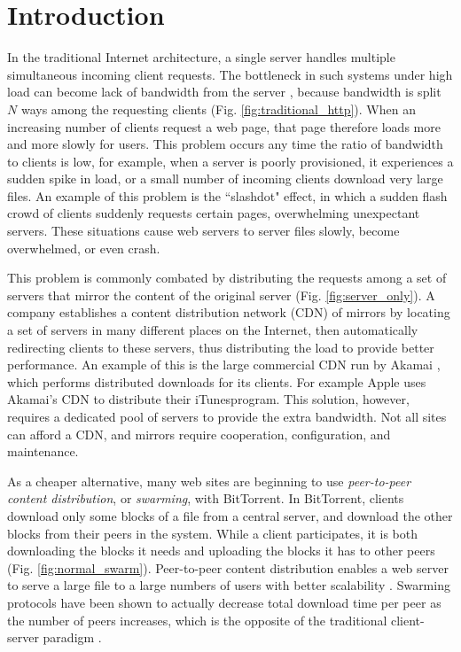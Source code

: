 \chapter {Introduction}

In the traditional Internet architecture, a single server handles multiple simultaneous incoming client requests.  
The bottleneck in such systems under high load can become lack of bandwidth from the server \cite{coopnet}, because bandwidth is split $N$ 
ways among the requesting clients (Fig. \ref{fig:traditional_http}).  When an increasing number of clients request a web page, that page 
therefore loads more and more slowly for users.  This problem occurs any time the ratio of bandwidth to clients is low, for example, when a server 
is poorly provisioned, it experiences a sudden spike in load, or a small number of incoming clients download very large files.  An example of this problem 
is the ``slashdot" effect, in which a sudden flash crowd of clients suddenly requests certain pages, overwhelming unexpectant servers.  
These situations cause web servers to server files slowly, become overwhelmed, or even crash.

This problem is commonly combated by distributing the requests among a set of servers that mirror the content of the original server (Fig. \ref{fig:server_only}).  
A company establishes a content distribution network (CDN) of mirrors by locating a set of servers in many different places on the Internet, then automatically redirecting clients to these servers, thus 
distributing the load to provide better performance.  An example of this is the large commercial CDN run by Akamai \cite{akamai}, which performs distributed
downloads for its clients.  For example Apple uses Akamai's CDN to distribute their iTunes\texttrademark   program.  This solution,  however, requires a dedicated pool of 
servers to provide the extra bandwidth.  Not all sites can afford a CDN, and  mirrors require cooperation, configuration, and maintenance.

As a cheaper alternative, many web sites are beginning to use \emph{peer-to-peer content distribution}, or \emph{swarming}, with BitTorrent.  In BitTorrent, clients 
download only some blocks of a file from a central server, and download the other blocks from their peers in the system.  While a client participates, it is both downloading 
the  blocks it needs and uploading the blocks it has to other peers (Fig. \ref{fig:normal_swarm}).  Peer-to-peer content distribution enables a 
web server to serve a large file to a large numbers of users with better scalability \cite{zappala}. Swarming protocols have been shown to actually decrease total download 
time per peer as the number of peers increases, which is the opposite of the traditional client-server paradigm \cite{slurpie}. 

